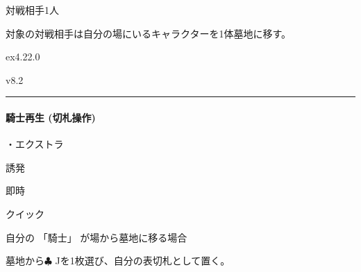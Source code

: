 \documentclass[letterpaper,10pt,dvipdfmx]{sphinxmanual}
\begin{document}
\sphinxAtStartPar
{}

\sphinxAtStartPar
対戦相手1人

\sphinxAtStartPar
{}

\sphinxAtStartPar
対象の対戦相手は自分の場にいるキャラクターを1体墓地に移す。

\sphinxAtStartPar
{}  ex4.22.0

\sphinxAtStartPar
{}  v8.2


\bigskip\hrule\bigskip



\paragraph{騎士再生 (切札操作)}
\label{\detokenize{auto/frameActionlist:id87}}\label{\detokenize{auto/frameActionlist:id88}}
\sphinxAtStartPar
{}

\sphinxAtStartPar
・エクストラ

\sphinxAtStartPar
{} 誘発

\sphinxAtStartPar
{} 即時

\sphinxAtStartPar
{} クイック

\sphinxAtStartPar
{}

\sphinxAtStartPar
自分の 「騎士」 が場から墓地に移る場合

\sphinxAtStartPar
{}

\sphinxAtStartPar
墓地から{\normalsize $\clubsuit$} Jを1枚選び、自分の表切札として置く。
\end{document}
